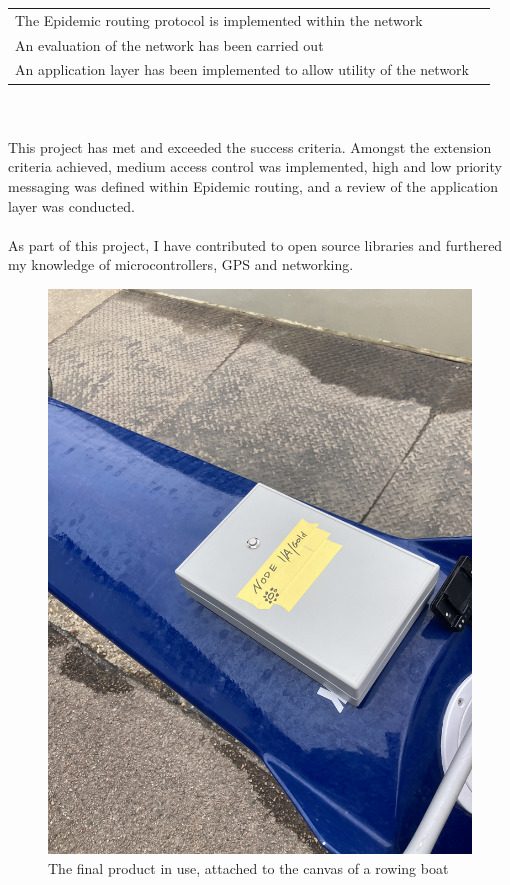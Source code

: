 \documentclass[12pt,a4paper]{report}
\begin{document}
{\begin{tabular}{ll}
The Epidemic routing protocol is implemented within the network\\
An evaluation of the network has been carried out\\
An application layer has been implemented to allow utility of the network \\
\end{tabular} \\ \\
This project has met and exceeded the success criteria. Amongst the extension criteria achieved, medium access control was implemented, high and low priority messaging was defined within Epidemic routing, and a review of the application layer was conducted. \\ \\
As part of this project, I have contributed to open source libraries and furthered my knowledge of microcontrollers, GPS and networking. 

\begin{figure}[h]
\begin{center}
\includegraphics[scale=0.15]{boxOnBoat.jpeg}
\end{center}
\caption{The final product in use, attached to the canvas of a rowing boat}
\end{figure}
\FloatBarrier

}
\end{document}
